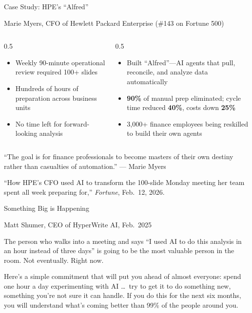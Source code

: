 \documentclass[aspectratio=169]{beamer}
\begin{document}
\begin{frame}[shrink=5]{Case Study: HPE's ``Alfred''}
\centerline{Marie Myers, CFO of Hewlett Packard Enterprise (\#143 on Fortune 500)}
\vspace{0.2cm}
\begin{columns}[T]
\begin{column}{0.5\textwidth}
\begin{shadedbox}[title=\textbf{The Problem}]
\begin{itemize}\small
  \item Weekly 90-minute operational review required 100+ slides
  \item Hundreds of hours of preparation across business units
  \item No time left for forward-looking analysis
\end{itemize}
\end{shadedbox}
\end{column}
\begin{column}{0.5\textwidth}
\begin{shadedbox}[title=\textbf{The AI Solution}]
\begin{itemize}\small
  \item Built ``Alfred''---AI agents that pull, reconcile, and analyze data automatically
  \item \textbf{90\%} of manual prep eliminated; cycle time reduced \textbf{40\%}, costs down \textbf{25\%}
  \item 3,000+ finance employees being reskilled to build their own agents
\end{itemize}
\end{shadedbox}
\end{column}
\end{columns}
\vspace{0.2cm}
\centering
``The goal is for finance professionals to become \alert{masters of their own destiny} rather than casualties of automation.'' --- Marie Myers

\vspace{0.1cm}
{\scriptsize ``How HPE's CFO used AI to transform the 100-slide Monday meeting her team spent all week preparing for,'' \textit{Fortune}, Feb.\ 12, 2026.}
\end{frame}

\begin{frame}{Something Big is Happening}
\centerline{Matt Shumer, CEO of HyperWrite AI, Feb.\ 2025}

The person who walks into a meeting and says ``I used AI to do this analysis in an hour instead of three days'' is going to be the most valuable person in the room. Not eventually. Right now.

\bigskip

Here's a simple commitment that will put you ahead of almost everyone: spend one hour a day experimenting with AI \ldots\ try to get it to do something new, something you're not sure it can handle. If you do this for the next six months, you will understand what's coming better than 99\% of the people around you.
\end{frame}
\end{document}

